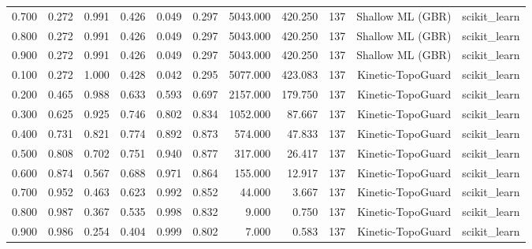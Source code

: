 \begin{tabular}{lrrrrrrrrrr}
0.700 & 0.272 & 0.991 & 0.426 & 0.049 & 0.297 & 5043.000 & 420.250 & 137 & Shallow ML (GBR) & scikit\_learn \\
0.800 & 0.272 & 0.991 & 0.426 & 0.049 & 0.297 & 5043.000 & 420.250 & 137 & Shallow ML (GBR) & scikit\_learn \\
0.900 & 0.272 & 0.991 & 0.426 & 0.049 & 0.297 & 5043.000 & 420.250 & 137 & Shallow ML (GBR) & scikit\_learn \\
0.100 & 0.272 & 1.000 & 0.428 & 0.042 & 0.295 & 5077.000 & 423.083 & 137 & Kinetic-TopoGuard & scikit\_learn \\
0.200 & 0.465 & 0.988 & 0.633 & 0.593 & 0.697 & 2157.000 & 179.750 & 137 & Kinetic-TopoGuard & scikit\_learn \\
0.300 & 0.625 & 0.925 & 0.746 & 0.802 & 0.834 & 1052.000 & 87.667 & 137 & Kinetic-TopoGuard & scikit\_learn \\
0.400 & 0.731 & 0.821 & 0.774 & 0.892 & 0.873 & 574.000 & 47.833 & 137 & Kinetic-TopoGuard & scikit\_learn \\
0.500 & 0.808 & 0.702 & 0.751 & 0.940 & 0.877 & 317.000 & 26.417 & 137 & Kinetic-TopoGuard & scikit\_learn \\
0.600 & 0.874 & 0.567 & 0.688 & 0.971 & 0.864 & 155.000 & 12.917 & 137 & Kinetic-TopoGuard & scikit\_learn \\
0.700 & 0.952 & 0.463 & 0.623 & 0.992 & 0.852 & 44.000 & 3.667 & 137 & Kinetic-TopoGuard & scikit\_learn \\
0.800 & 0.987 & 0.367 & 0.535 & 0.998 & 0.832 & 9.000 & 0.750 & 137 & Kinetic-TopoGuard & scikit\_learn \\
0.900 & 0.986 & 0.254 & 0.404 & 0.999 & 0.802 & 7.000 & 0.583 & 137 & Kinetic-TopoGuard & scikit\_learn \\
\bottomrule
\end{tabular}